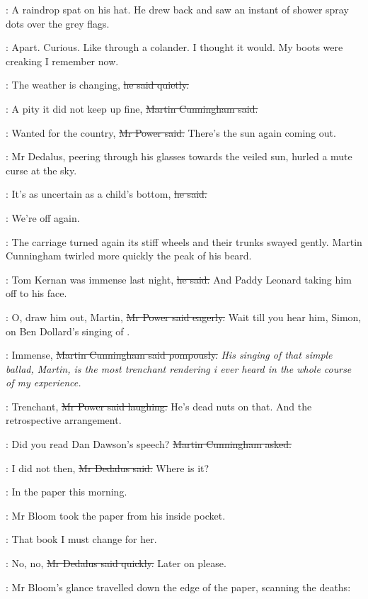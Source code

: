 :
A raindrop spat on his hat.
He drew back and saw an instant of shower spray dots over the grey flags.

\BloomInt:
Apart.
Curious.
Like through a colander.
I thought it would.
My boots were creaking I remember now.

\Bloom:
The weather is changing,
\sout{he said quietly.}

\cunningham:
A pity it did not keep up fine,
\sout{Martin Cunningham said.}

\power:
Wanted for the country,
\sout{Mr Power said.}
There's the sun again coming out.

:
Mr Dedalus, peering through his glasses towards the veiled sun,
hurled a mute curse at the sky.

\simon:
It's as uncertain as a child's bottom,
\sout{he said.}

\cunningham:
We're off again.

:
The carriage turned again its stiff wheels
and their trunks swayed gently.
Martin Cunningham twirled more quickly the peak of his beard.

\cunningham:
Tom Kernan was immense last night,
\sout{he said.}
And Paddy Leonard taking him off to his face.

\power:
O, draw him out, Martin,
\sout{Mr Power said eagerly.}
Wait till you hear him, Simon,
on Ben Dollard's singing of .

\cunningham:
Immense,
\sout{Martin Cunningham said pompously.}
\emph{His singing of that simple ballad, Martin,
is the most trenchant rendering i ever heard in the whole course of my experience.}

\power:
Trenchant,
\sout{Mr Power said laughing.}
He's dead nuts on that.
And the retrospective arrangement.%

\cunningham:
Did you read Dan Dawson's speech?
\sout{Martin Cunningham asked.}

\simon:
I did not then,
\sout{Mr Dedalus said.}
Where is it?

\cunningham:
In the paper this morning.

:
Mr Bloom took the paper from his inside pocket.

\BloomInt:
That book I must change for her.

\simon:
No, no,
\sout{Mr Dedalus said quickly.}
Later on please.

:
Mr Bloom's glance travelled down the edge of the paper,
scanning the deaths:

